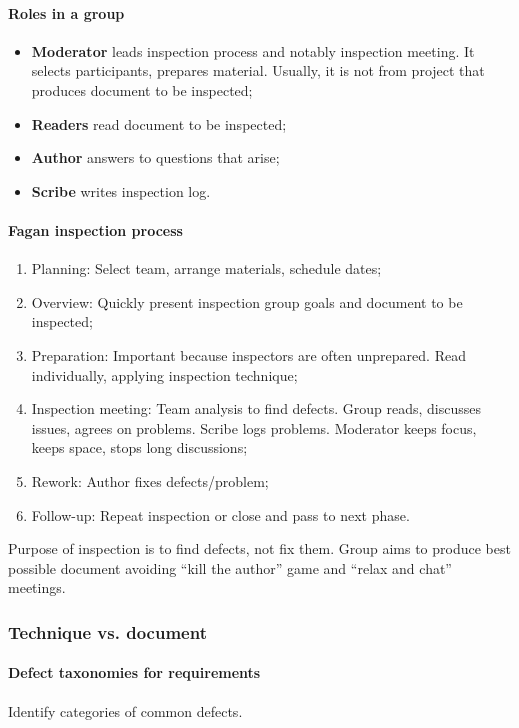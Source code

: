 \paragraph{Roles in a group}
\begin{itemize}
\item \textbf{Moderator} leads inspection process and notably inspection meeting. It selects participants, prepares material. Usually, it is not from project that produces document to be inspected;
\item \textbf{Readers} read document to be inspected;
\item \textbf{Author} answers to questions that arise;
\item \textbf{Scribe} writes inspection log.
\end{itemize}

\paragraph{Fagan inspection process}
\begin{enumerate}
\item Planning: Select team, arrange materials, schedule dates;
\item Overview: Quickly present inspection group goals and document to be inspected;
\item Preparation: Important because inspectors are often unprepared. Read individually, applying inspection technique;
\item Inspection meeting: Team analysis to find defects. Group reads, discusses issues, agrees on problems. Scribe logs problems. Moderator keeps focus, keeps space, stops long discussions;
\item Rework: Author fixes defects/problem;
\item Follow-up: Repeat inspection or close and pass to next phase.
\end{enumerate}

Purpose of inspection is to find defects, not fix them. Group aims to produce best possible document avoiding ``kill the author'' game and ``relax and chat'' meetings.

\subsubsection{Technique vs. document}
\paragraph{Defect taxonomies for requirements}
Identify categories of common defects.


